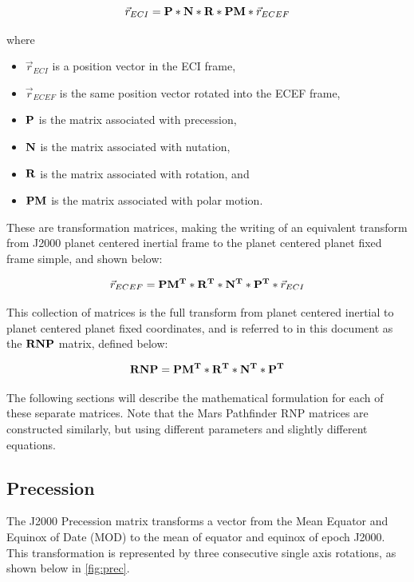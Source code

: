 \begin{equation}\label{base_rnp_transform}
\vec{r}_{ECI} = {\bf P} * {\bf N} * {\bf R} * {\bf PM} * \vec{r}_{ECEF}
\end{equation}

where

\begin{itemize}
\item $\vec{r}_{ECI}$ is a position vector in the ECI frame,
\item $\vec{r}_{ECEF}$ is the same position vector rotated into the ECEF frame,
\item ${\bf P}$ is the matrix associated with precession,
\item ${\bf N}$ is the matrix associated with nutation,
\item ${\bf R}$ is the matrix associated with rotation, and
\item ${\bf PM}$ is the matrix associated with polar motion.
\end{itemize}

These are transformation matrices, making the writing of an equivalent transform
from J2000 planet centered inertial frame to the planet centered planet fixed
frame simple, and shown below:

\begin{equation}\label{backwards_rnp_transform}
\vec{r}_{ECEF} = {\bf PM^T} * {\bf R^T} * {\bf N^T} * {\bf P^T} * \vec{r}_{ECI}
\end{equation}

This collection of matrices is the full transform from planet centered inertial
to planet centered planet fixed coordinates, and is
referred to in this document as the ${\bf RNP}$ matrix, defined below:

\begin{equation}\label{rnp_definition}
{\bf RNP} = {\bf PM^T} * {\bf R^T} * {\bf N^T} * {\bf P^T}
\end{equation}


The following sections will describe the mathematical formulation for each
of these separate matrices. Note that the Mars Pathfinder RNP matrices are
constructed similarly, but using different parameters and slightly different
equations.

\subsection{Precession}

The J2000 Precession matrix transforms a vector from the Mean Equator 
and Equinox of Date (MOD) to the mean of
equator and equinox of epoch J2000. This transformation is represented by
three consecutive single axis rotations, as shown below in 
\ref{fig:prec}.

